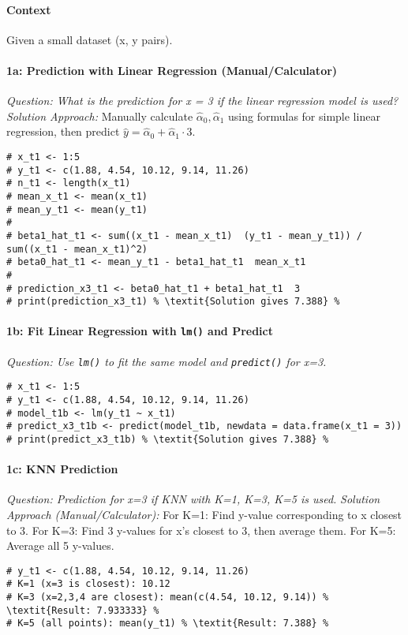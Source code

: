 \documentclass[12pt,a4paper]{article}
\newcommand{\Rfunction}[1]{\texttt{#1()}} %
\begin{document}
            \paragraph{Context} Given a small dataset (x, y pairs).
            \paragraph{1a: Prediction with Linear Regression (Manual/Calculator)}
                \textit{Question: What is the prediction for x = 3 if the linear regression model is used?}
                \textit{Solution Approach:} Manually calculate $\hat{\alpha}_0, \hat{\alpha}_1$ using formulas for simple linear regression, then predict $\hat{y} = \hat{\alpha}_0 + \hat{\alpha}_1 \cdot 3$.
\begin{lstlisting}[caption={Manual OLS Calculation (Conceptual - Ex Set 1, T1a)}]
# x_t1 <- 1:5
# y_t1 <- c(1.88, 4.54, 10.12, 9.14, 11.26)
# n_t1 <- length(x_t1)
# mean_x_t1 <- mean(x_t1)
# mean_y_t1 <- mean(y_t1)
# 
# beta1_hat_t1 <- sum((x_t1 - mean_x_t1)  (y_t1 - mean_y_t1)) / sum((x_t1 - mean_x_t1)^2)
# beta0_hat_t1 <- mean_y_t1 - beta1_hat_t1  mean_x_t1
# 
# prediction_x3_t1 <- beta0_hat_t1 + beta1_hat_t1  3
# print(prediction_x3_t1) % \textit{Solution gives 7.388} %
\end{lstlisting}
            \paragraph{1b: Fit Linear Regression with \Rfunction{lm} and Predict}
                \textit{Question: Use \Rfunction{lm} to fit the same model and \Rfunction{predict} for x=3.}
\begin{lstlisting}[caption={Using lm and predict (Ex Set 1, T1b)}]
# x_t1 <- 1:5
# y_t1 <- c(1.88, 4.54, 10.12, 9.14, 11.26)
# model_t1b <- lm(y_t1 ~ x_t1)
# predict_x3_t1b <- predict(model_t1b, newdata = data.frame(x_t1 = 3))
# print(predict_x3_t1b) % \textit{Solution gives 7.388} %
\end{lstlisting}
            \paragraph{1c: KNN Prediction}
                \textit{Question: Prediction for x=3 if KNN with K=1, K=3, K=5 is used.}
                \textit{Solution Approach (Manual/Calculator):}
                For K=1: Find y-value corresponding to x closest to 3.
                For K=3: Find 3 y-values for x's closest to 3, then average them.
                For K=5: Average all 5 y-values.
\begin{lstlisting}[caption={KNN Predictions (Conceptual - Ex Set 1, T1c)}]
# y_t1 <- c(1.88, 4.54, 10.12, 9.14, 11.26)
# K=1 (x=3 is closest): 10.12
# K=3 (x=2,3,4 are closest): mean(c(4.54, 10.12, 9.14)) % \textit{Result: 7.933333} %
# K=5 (all points): mean(y_t1) % \textit{Result: 7.388} %
\end{lstlisting}
\end{document}
